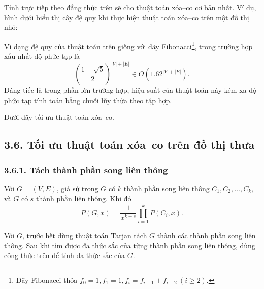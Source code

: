 \documentclass[11pt]{article}
\begin{document}
Tính trực tiếp theo đẳng thức trên sẽ cho thuật toán xóa--co cơ bản nhất. Ví
dụ, hình dưới biểu thị cây đệ quy khi thực hiện thuật toán xóa--co trên một
đồ thị nhỏ:

\begin{center}
\end{center}

Vì dạng đệ quy của thuật toán trên giống với dãy Fibonacci\footnote{Dãy
Fibonacci thỏa \(f_0=1,f_1=1,f_i=f_{i-1}+f_{i-2}\ (i\ge2)\).}, trong trường
hợp xấu nhất độ phức tạp là
\[
  \left(\frac{1+\sqrt5}{2}\right)^{|V|+|E|}
  \in O(1.62^{|V|+|E|}).
\]
Đáng tiếc là trong phần lớn trường hợp, hiệu suất của thuật toán này kém xa
độ phức tạp tính toán bằng chuỗi lũy thừa theo tập hợp.

Dưới đây tối ưu thuật toán xóa--co.

\subsection*{3.6. Tối ưu thuật toán xóa--co trên đồ thị thưa}

\subsubsection*{3.6.1. Tách thành phần song liên thông}

Với \(G=(V,E)\), giả sử trong \(G\) có \(k\) thành phần song liên thông
\(C_1,C_2,\ldots,C_k\), và \(G\) có \(s\) thành phần liên thông. Khi đó
\[
  P(G,x)=\frac{1}{x^{k-s}}\prod_{i=1}^{k}P(C_i,x).
\]

Với \(G\), trước hết dùng thuật toán Tarjan tách \(G\) thành các thành phần
song liên thông. Sau khi tìm được đa thức sắc của từng thành phần song liên
thông, dùng công thức trên để tính đa thức sắc của \(G\).
\end{document}
